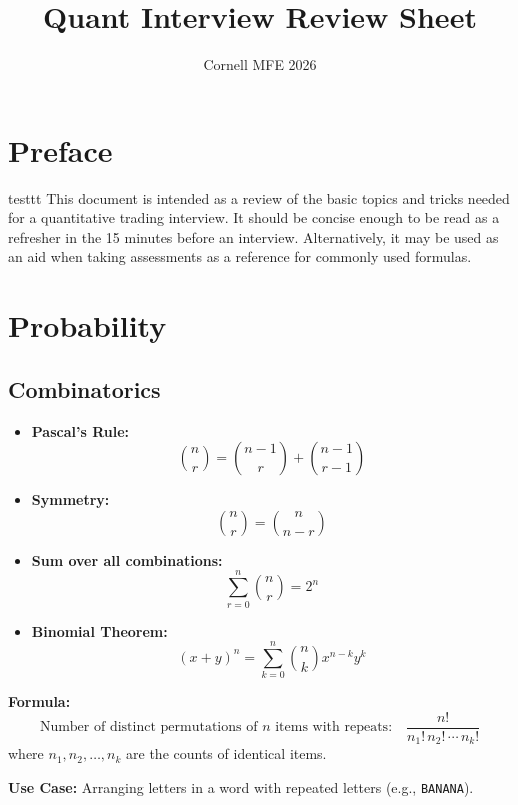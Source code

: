 \documentclass{article}
\title{Quant Interview Review Sheet}
\author{Cornell MFE 2026}
\begin{document}
\maketitle
\tableofcontents

\section{Preface}
testtt
This document is intended as a review of the basic topics and tricks needed for a quantitative trading interview. It should be concise enough to be read as a refresher in the 15 minutes before an interview. Alternatively, it may be used as an aid when taking assessments as a reference for commonly used formulas.

\newpage

\section{Probability}
\subsection{Combinatorics}

\begin{tcolorbox}[title=Useful Combinatorics Identities]
\begin{itemize}
  \item \textbf{Pascal's Rule:}
  \[
  \binom{n}{r} = \binom{n-1}{r} + \binom{n-1}{r-1}
  \]

  \item \textbf{Symmetry:}
  \[
  \binom{n}{r} = \binom{n}{n - r}
  \]

  \item \textbf{Sum over all combinations:}
  \[
  \sum_{r=0}^{n} \binom{n}{r} = 2^n
  \]

  \item \textbf{Binomial Theorem:}
  \[
  (x + y)^n = \sum_{k=0}^{n} \binom{n}{k} x^{n-k} y^k
  \]
\end{itemize}
\end{tcolorbox}

\begin{tcolorbox}[title=Permutations with Identical Items]
\textbf{Formula:}
\[
\text{Number of distinct permutations of } n \text{ items with repeats:} \quad
\frac{n!}{n_1! \, n_2! \, \cdots \, n_k!}
\]
where \( n_1, n_2, \ldots, n_k \) are the counts of identical items.

\textbf{Use Case:} Arranging letters in a word with repeated letters (e.g., \texttt{BANANA}).

\end{tcolorbox}
\end{document}
